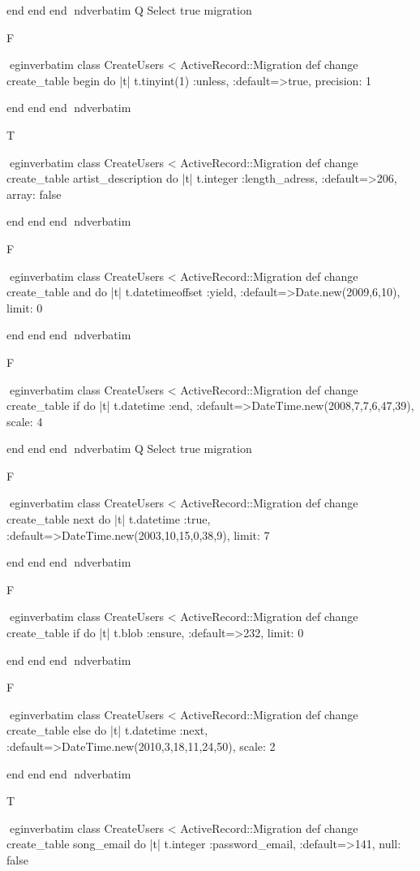     end 
  end 
end
nd{verbatim}
Q
 Select true migration

F

egin{verbatim}
 class CreateUsers < ActiveRecord::Migration 
  def change 
    create_table begin do |t| 
      t.tinyint(1) :unless, :default=>true, precision: 1
    
    end 
  end 
end
nd{verbatim}

T

egin{verbatim}
 class CreateUsers < ActiveRecord::Migration 
  def change 
    create_table artist_description do |t| 
      t.integer :length_adress, :default=>206, array: false
    
    end 
  end 
end
nd{verbatim}

F

egin{verbatim}
 class CreateUsers < ActiveRecord::Migration 
  def change 
    create_table and do |t| 
      t.datetimeoffset :yield, :default=>Date.new(2009,6,10), limit: 0
    
    end 
  end 
end
nd{verbatim}

F

egin{verbatim}
 class CreateUsers < ActiveRecord::Migration 
  def change 
    create_table if do |t| 
      t.datetime :end, :default=>DateTime.new(2008,7,7,6,47,39), scale: 4
    
    end 
  end 
end
nd{verbatim}
Q
 Select true migration

F

egin{verbatim}
 class CreateUsers < ActiveRecord::Migration 
  def change 
    create_table next do |t| 
      t.datetime :true, :default=>DateTime.new(2003,10,15,0,38,9), limit: 7
    
    end 
  end 
end
nd{verbatim}

F

egin{verbatim}
 class CreateUsers < ActiveRecord::Migration 
  def change 
    create_table if do |t| 
      t.blob :ensure, :default=>232, limit: 0
    
    end 
  end 
end
nd{verbatim}

F

egin{verbatim}
 class CreateUsers < ActiveRecord::Migration 
  def change 
    create_table else do |t| 
      t.datetime :next, :default=>DateTime.new(2010,3,18,11,24,50), scale: 2
    
    end 
  end 
end
nd{verbatim}

T

egin{verbatim}
 class CreateUsers < ActiveRecord::Migration 
  def change 
    create_table song_email do |t| 
      t.integer :password_email, :default=>141, null: false
    
